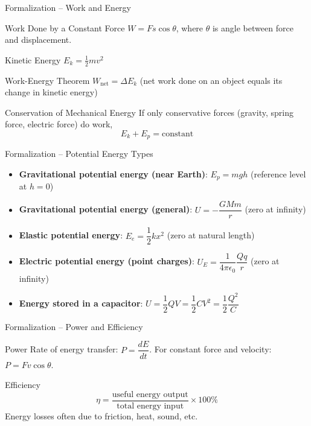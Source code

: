 \documentclass[11pt]{beamer}
\begin{document}
\begin{frame}{Formalization – Work and Energy}
\begin{block}{Work Done by a Constant Force}
$W = Fs\cos\theta$, where $\theta$ is angle between force and displacement.
\end{block}
\begin{block}{Kinetic Energy}
$E_k = \frac12 mv^2$
\end{block}
\begin{block}{Work-Energy Theorem}
$W_{\text{net}} = \Delta E_k$ (net work done on an object equals its change in kinetic energy)
\end{block}
\begin{block}{Conservation of Mechanical Energy}
If only conservative forces (gravity, spring force, electric force) do work,
\[ E_k + E_p = \text{constant} \]
\end{block}
\end{frame}

\begin{frame}{Formalization – Potential Energy Types}
\begin{itemize}
    \item \textbf{Gravitational potential energy (near Earth)}: $E_p = mgh$ (reference level at $h=0$)
    \item \textbf{Gravitational potential energy (general)}: $U = -\dfrac{GMm}{r}$ (zero at infinity)
    \item \textbf{Elastic potential energy}: $E_e = \dfrac12 kx^2$ (zero at natural length)
    \item \textbf{Electric potential energy (point charges)}: $U_E = \dfrac{1}{4\pi\epsilon_0}\dfrac{Qq}{r}$ (zero at infinity)
    \item \textbf{Energy stored in a capacitor}: $U = \dfrac12 QV = \dfrac12 CV^2 = \dfrac12 \dfrac{Q^2}{C}$
\end{itemize}
\end{frame}

\begin{frame}{Formalization – Power and Efficiency}
\begin{block}{Power}
Rate of energy transfer: $P = \dfrac{dE}{dt}$.
For constant force and velocity: $P = Fv\cos\theta$.
\end{block}
\begin{block}{Efficiency}
\[ \eta = \frac{\text{useful energy output}}{\text{total energy input}} \times 100\% \]
Energy losses often due to friction, heat, sound, etc.
\end{block}
\end{frame}
\end{document}
